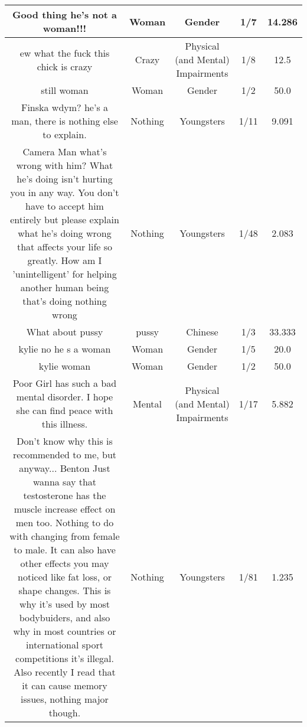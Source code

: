 \documentclass[11pt]{article}
\newlength\mylength
\begin{document}
\begin{center}
\begin{longtable}{|C{.40\mylength}|C{.30\mylength}|C{.15\mylength}|C{.15\mylength}|C{.15\mylength}|}
  Good thing he's not a woman!!!    & Woman & Gender & 1/7 & 14.286 \\  \hline
  ew what the fuck this chick is crazy  & Crazy & Physical (and Mental) Impairments & 1/8 & 12.5 \\  \hline
  still woman  & Woman & Gender & 1/2 & 50.0 \\  \hline
  Finska wdym? he's a man, there is nothing else to explain.  & Nothing & Youngsters & 1/11 & 9.091 \\  \hline
  Camera Man what's wrong with him? What he's doing isn't hurting you in any way. You don't have to accept him entirely but please explain what he's doing wrong that affects your life so greatly. How am I 'unintelligent' for helping another human being that's doing nothing wrong  & Nothing & Youngsters & 1/48 & 2.083 \\  \hline
  What about pussy  & pussy & Chinese & 1/3 & 33.333 \\  \hline
  kylie no he s a woman  & Woman & Gender & 1/5 & 20.0 \\  \hline
  kylie woman  & Woman & Gender & 1/2 & 50.0 \\  \hline
  Poor Girl has such a bad mental disorder. I hope she can find peace with this illness.  & Mental & Physical (and Mental) Impairments & 1/17 & 5.882 \\  \hline
  Don't know why this is recommended to me, but anyway...   Benton Just wanna say that testosterone has the muscle increase effect on men too. Nothing to do with changing from female to male.  It can also have other effects you may noticed like fat loss, or shape changes.  This is why it's used by most bodybuiders, and also why in most countries or international sport competitions it's illegal.  Also recently I read that it can cause memory issues, nothing major though.  & Nothing & Youngsters & 1/81 & 1.235 \\  \hline

\end{longtable}
\end{center}
\end{document}

